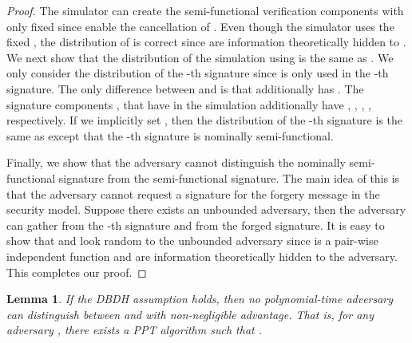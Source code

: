 \documentclass[11pt,letterpaper]{article}
\newtheorem{lemma}[theorem]{Lemma}
\begin{document}
\begin{proof}
The simulator can create the semi-functional verification components with
only fixed  since  enable the cancellation of
. Even though the simulator uses the fixed , the
distribution of  is correct since  are information theoretically
hidden to .
We next show that the distribution of the simulation using  is the same as . We only consider the distribution of
the -th signature since  is only used in the -th signature. The only
difference between  and  is that  additionally has . The
signature components , 
that have  in the simulation additionally have , , , ,  respectively. If we implicitly set
, then the distribution of the -th signature is the
same as  except that the -th signature is nominally
semi-functional.

Finally, we show that the adversary cannot distinguish the nominally
semi-functional signature from the semi-functional signature. The main idea
of this is that the adversary cannot request a signature for the forgery
message  in the security model. Suppose there exists an unbounded
adversary, then the adversary can gather  from the -th
signature and  from the forged signature. It is easy to show
that  and  look random to the unbounded adversary since  is a pair-wise independent function and  are information
theoretically hidden to the adversary.
This completes our proof.
\end{proof}

\begin{lemma} \label{lem:pks1-prime-3}
If the DBDH assumption holds, then no polynomial-time adversary can
distinguish between  and  with non-negligible advantage.
That is, for any adversary , there exists a PPT algorithm 
such that
    .
\end{lemma}
\end{document}
